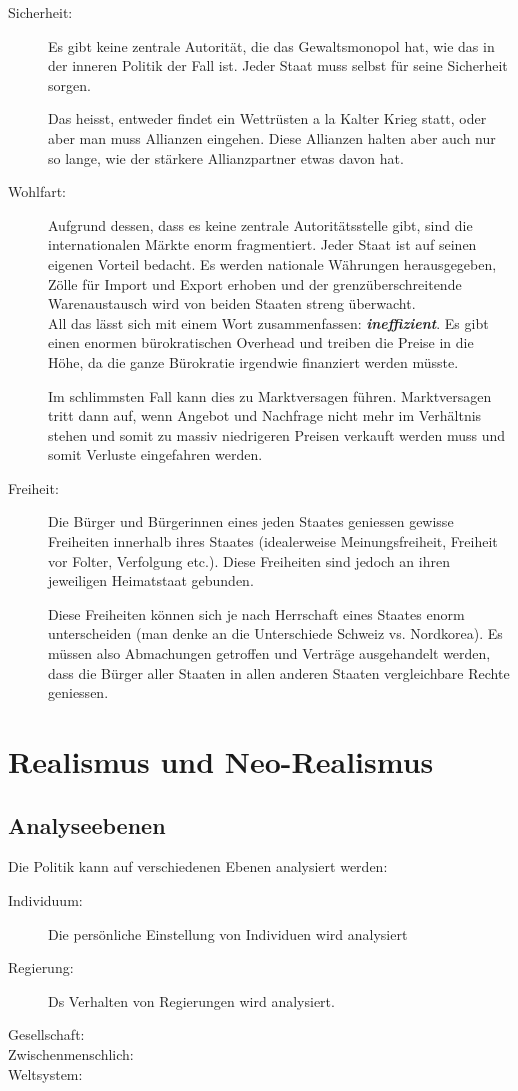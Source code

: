 \documentclass[a4paper, 11pt]{article}
\begin{document}
\begin{description}
	\item[Sicherheit: ] Es gibt keine zentrale Autorität, die das Gewaltsmonopol hat, wie das in der inneren Politik der Fall ist. Jeder Staat muss selbst für seine Sicherheit sorgen.
	
	
	Das heisst, entweder findet ein Wettrüsten a la Kalter Krieg statt, oder aber man muss Allianzen eingehen. Diese Allianzen halten aber auch nur so lange, wie der stärkere Allianzpartner etwas davon hat.
	\item[Wohlfart: ] Aufgrund dessen, dass es keine zentrale Autoritätsstelle 	gibt, sind die internationalen Märkte enorm fragmentiert. Jeder Staat ist auf seinen eigenen Vorteil bedacht. Es werden nationale Währungen herausgegeben, Zölle für Import und Export erhoben und der grenzüberschreitende Warenaustausch wird von beiden Staaten streng überwacht. \\
	All das lässt sich mit einem Wort zusammenfassen: \textit{\textbf{ineffizient}}. Es gibt einen enormen bürokratischen Overhead und treiben die Preise in die Höhe, da die ganze Bürokratie irgendwie finanziert werden müsste.
	
	
	Im schlimmsten Fall kann dies zu Marktversagen führen. Marktversagen tritt dann auf, wenn Angebot und Nachfrage nicht mehr im Verhältnis stehen und somit zu massiv niedrigeren Preisen verkauft werden muss und somit Verluste eingefahren werden.
	
	\item[Freiheit: ] Die Bürger und Bürgerinnen eines jeden Staates geniessen gewisse Freiheiten innerhalb ihres Staates (idealerweise Meinungsfreiheit, Freiheit vor Folter, Verfolgung etc.). Diese Freiheiten sind jedoch an ihren jeweiligen Heimatstaat gebunden.
	
	
	Diese Freiheiten können sich je nach Herrschaft eines Staates enorm unterscheiden (man denke an die Unterschiede Schweiz vs. Nordkorea). Es müssen also Abmachungen getroffen und Verträge ausgehandelt werden, dass die Bürger aller Staaten in allen anderen Staaten vergleichbare Rechte geniessen.
\end{description}

\section{Realismus und Neo-Realismus}



\subsection{Analyseebenen}
Die Politik kann auf verschiedenen Ebenen analysiert werden:

\begin{description}
	\item[Individuum: ] Die persönliche Einstellung von Individuen wird analysiert
	\item[Regierung: ] Ds Verhalten von Regierungen wird analysiert.
	\item[Gesellschaft: ]
	\item[Zwischenmenschlich: ]
	\item[Weltsystem: ]
\end{description} 
\end{document}
